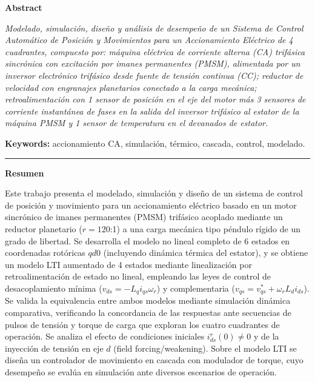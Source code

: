 \documentclass[12pt, a4paper,journal, onecolumn, compsoc]{IEEEtran}
\begin{document}
\setcounter{page}{1}
\thispagestyle{fancy}

\vspace*{-1cm}
\noindent\textbf{\large Abstract}
\vspace{4pt}

\noindent\textit{Modelado, simulación, diseño y análisis de desempeño de un Sistema de Control Automático de
Posición y Movimientos para un Accionamiento Eléctrico de 4 cuadrantes, compuesto por: máquina
eléctrica de corriente alterna (CA) trifásica sincrónica con excitación por imanes permanentes (PMSM),
alimentada por un inversor electrónico trifásico desde fuente de tensión continua (CC); reductor de
velocidad con engranajes planetarios conectado a la carga mecánica; retroalimentación con 1 sensor
de posición en el eje del motor más 3 sensores de corriente instantánea de fases en la salida del
inversor trifásico al estator de la máquina PMSM y 1 sensor de temperatura en el devanados de estator.}

\vspace{6pt}
\noindent\textbf{Keywords:} accionamiento CA, simulación, térmico, cascada, control, modelado.

\vspace{8pt}
\noindent\rule{\textwidth}{0.4pt}
\vspace{4pt}

\noindent\textbf{\large Resumen}
\vspace{4pt}

\noindent Este trabajo presenta el modelado, simulación y diseño de un sistema de control de posición y movimiento para un accionamiento eléctrico basado en un motor sincrónico de imanes permanentes (PMSM) trifásico acoplado mediante un reductor planetario ($r = 120$:1) a una carga mecánica tipo péndulo rígido de un grado de libertad. Se desarrolla el modelo no lineal completo de 6 estados en coordenadas rotóricas $qd0$ (incluyendo dinámica térmica del estator), y se obtiene un modelo LTI aumentado de 4 estados mediante linealización por retroalimentación de estado no lineal, empleando las leyes de control de desacoplamiento mínima ($v_{ds} = -L_q i_{qs} \omega_r$) y complementaria ($v_{qs} = v_{qs}^* + \omega_r L_d i_{ds}$). Se valida la equivalencia entre ambos modelos mediante simulación dinámica comparativa, verificando la concordancia de las respuestas ante secuencias de pulsos de tensión y torque de carga que exploran los cuatro cuadrantes de operación. Se analiza el efecto de condiciones iniciales $i_{ds}^r(0) \neq 0$ y de la inyección de tensión en eje $d$ (field forcing/weakening). Sobre el modelo LTI se diseña un controlador de movimiento en cascada con modulador de torque, cuyo desempeño se evalúa en simulación ante diversos escenarios de operación.
\end{document}
